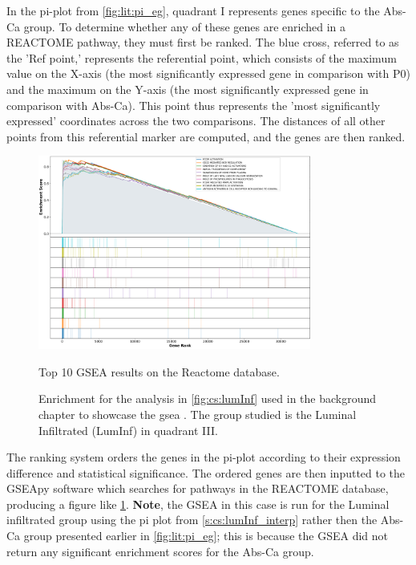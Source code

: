 In the pi-plot from \cref{fig:lit:pi_eg}, quadrant I represents genes specific to the Abs-Ca group. To determine whether any of these genes are enriched in a REACTOME pathway, they must first be ranked. The blue cross, referred to as the 'Ref point,' represents the referential point, which consists of the maximum value on the X-axis (the most significantly expressed gene in comparison with P0) and the maximum on the Y-axis (the most significantly expressed gene in comparison with Abs-Ca). This point thus represents the 'most significantly expressed' coordinates across the two comparisons. The distances of all other points from this referential marker are computed, and the genes are then ranked. 


\begin{figure}[!htb]
    \centering
    \includegraphics[width=0.8\textwidth, keepaspectratio]{Sections/ClusteringAnalysis/Resources/discussion/other_groups/lumInf_reactome_10_top.png}
        \caption{Top 10 GSEA results on the Reactome database.}
    \caption{Enrichment for the analysis in \cref{fig:cs:lumInf} used in the background chapter to showcase the \acrshort{gsea} . The group studied is the Luminal Infiltrated (LumInf) in quadrant III.}
    \label{fig:lit:gsea_eg}
\end{figure}

The ranking system orders the genes in the pi-plot according to their expression difference and statistical significance. The ordered genes are then inputted to the GSEApy software which searches for pathways in the REACTOME database, producing a figure like \cref{fig:lit:gsea_eg}. \textbf{Note}, the GSEA in this case is run for the Luminal infiltrated group using the pi plot from \cref{s:cs:lumInf_interp} rather then the Abs-Ca group presented earlier in \cref{fig:lit:pi_eg}; this is because the GSEA did not return any significant enrichment scores for the Abs-Ca group.

